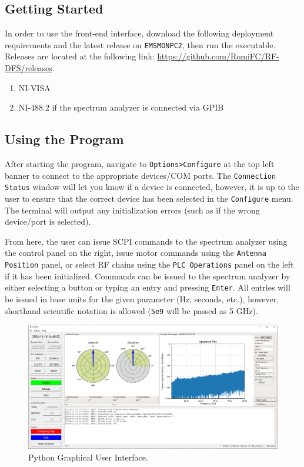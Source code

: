 \documentclass[titlepage]{article}
\begin{document}
\subsection{Getting Started}
In order to use the front-end interface, download the following deployment requirements and the latest release on \verb|EMSMONPC2|, then run the executable. Releases are located at the following link: \url{https://github.com/RomiFC/RF-DFS/releases}.
\begin{enumerate}
  \item NI-VISA
  \item NI-488.2 if the spectrum analyzer is connected via GPIB
\end{enumerate}

\subsection{Using the Program}\label{sec:usingtheprogram}
After starting the program, navigate to \verb|Options>Configure| at the top left banner to connect to the appropriate devices/COM ports. The \verb|Connection Status| window will let you know if a device is connected, however, it is up to the user to ensure that the correct device has been selected in the \verb|Configure| menu. The terminal will output any initialization errors (such as if the wrong device/port is selected).

From here, the user can issue SCPI commands to the spectrum analyzer using the control panel on the right, issue motor commands using the \verb|Antenna Position| panel, or select RF chains using the \verb|PLC Operations| panel on the left if it has been initialized. Commands can be issued to the spectrum analyzer by either selecting a button or typing an entry and pressing \verb|Enter|. All entries will be issued in base units for the given parameter (Hz, seconds, etc.), however, shorthand scientific notation is allowed (\verb|5e9| will be passed as 5 GHz).

\begin{figure}
  \begin{center}
    \includegraphics[width=\textwidth]{images/3gui.png}
  \end{center}
  \caption{Python Graphical User Interface.}\label{fig:gui}
\end{figure}
\end{document}
